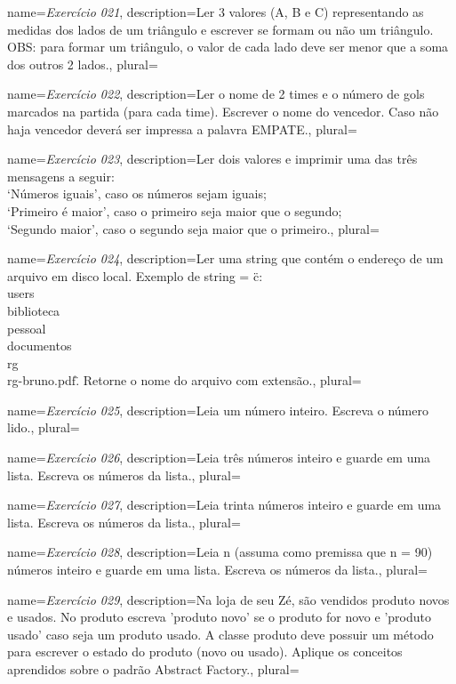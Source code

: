 {
	name={\textit{Exercício 021}},
	description={Ler 3 valores (A, B e C) representando as medidas dos lados de um triângulo e escrever se formam ou não um triângulo. OBS: para formar um triângulo, o valor de cada lado deve ser menor que a soma dos outros 2 lados.},
	plural={}
}


{
	name={\textit{Exercício 022}},
	description={Ler o nome de 2 times e o número de gols marcados na partida (para cada time). Escrever o nome do vencedor. Caso não haja vencedor deverá ser impressa a palavra EMPATE.},
	plural={}
}


{
	name={\textit{Exercício 023}},
	description={Ler dois valores e imprimir uma das três mensagens a seguir:\\
		‘Números iguais’, caso os números sejam iguais;\\
		‘Primeiro é maior’, caso o primeiro seja maior que o segundo;\\
		‘Segundo maior’, caso o segundo seja maior que o primeiro.},
	plural={}
}


{
	name={\textit{Exercício 024}},
	description={Ler uma string que contém o endereço de um arquivo em disco local. Exemplo de string = \"c:\\users\\biblioteca\\pessoal\\documentos\\rg\\rg-bruno.pdf\". Retorne o nome do arquivo com extensão.},
	plural={}
}


{
	name={\textit{Exercício 025}},
	description={Leia um número inteiro. Escreva o número lido.},
	plural={}
}

{
	name={\textit{Exercício 026}},
	description={Leia três números inteiro e guarde em uma lista. Escreva os números da lista.},
	plural={}
}


{
	name={\textit{Exercício 027}},
	description={Leia trinta números inteiro e guarde em uma lista. Escreva os números da lista.},
	plural={}
}


{
	name={\textit{Exercício 028}},
	description={Leia n (assuma como premissa que n = 90) números inteiro e guarde em uma lista. Escreva os números da lista.},
	plural={}
}

{
	name={\textit{Exercício 029}},
	description={Na loja de seu Zé, são vendidos produto novos e usados. No produto escreva 'produto novo' se o produto for novo e 'produto usado' caso seja um produto usado. A classe produto deve possuir um método para escrever o estado do produto (novo ou usado). Aplique os conceitos aprendidos sobre o padrão Abstract Factory.},
	plural={}
}

